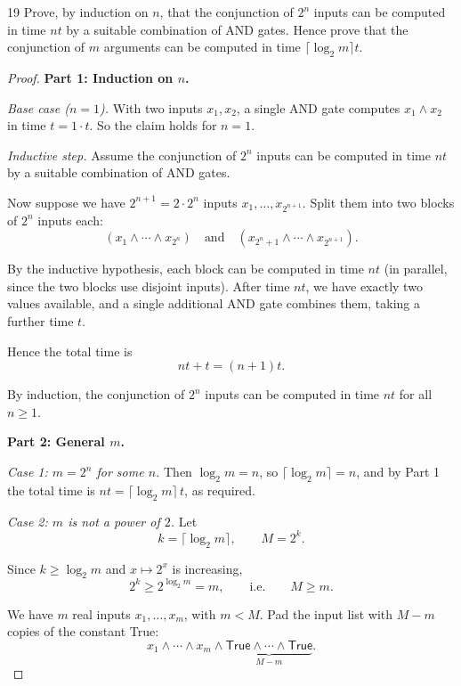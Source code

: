 \begin{exercise}{19}
    Prove, by induction on $n$, that the conjunction of $2^n$ inputs can be
    computed in time $nt$ by a suitable combination of AND gates. Hence prove
    that the conjunction of $m$ arguments can be computed in time
    $\lceil\log_2 m\rceil t$.
\end{exercise}
\begin{solbox}

\begin{proof}
\textbf{Part 1: Induction on $n$.}

\medskip
\noindent\textit{Base case ($n=1$).} With two inputs $x_1,x_2$, a single AND gate computes $x_1\wedge x_2$ in time $t = 1\cdot t$. So the claim holds for $n=1$.

\bigskip
\noindent\textit{Inductive step.} Assume the conjunction of $2^n$ inputs can be computed in time $nt$ by a suitable combination of AND gates.

Now suppose we have $2^{n+1}=2\cdot 2^n$ inputs $x_1,\dots,x_{2^{n+1}}$. Split them into two blocks of $2^n$ inputs each:
\[
(x_1\wedge\cdots\wedge x_{2^n}) \quad\text{and}\quad (x_{2^n+1}\wedge\cdots\wedge x_{2^{n+1}}).
\]

By the inductive hypothesis, each block can be computed in time $nt$ (in parallel, since the two blocks use disjoint inputs). After time $nt$, we have exactly two values available, and a single additional AND gate combines them, taking a further time $t$.

Hence the total time is
\[
nt + t = (n+1)t.
\]

By induction, the conjunction of $2^n$ inputs can be computed in time $nt$ for all $n\geq 1$.

\bigskip
\textbf{Part 2: General $m$.}

\medskip
\noindent\textit{Case 1: $m=2^n$ for some $n$.} Then $\log_2 m = n$, so $\lceil\log_2 m\rceil = n$, and by Part 1 the total time is $nt = \lceil\log_2 m\rceil\, t$, as required.

\bigskip
\noindent\textit{Case 2: $m$ is not a power of $2$.} Let
\[
k = \lceil \log_2 m\rceil, \qquad M = 2^k.
\]

Since $k\geq \log_2 m$ and $x\mapsto 2^x$ is increasing,
\[
2^k \geq 2^{\log_2 m} = m, \qquad\text{i.e.}\qquad M\geq m.
\]

We have $m$ real inputs $x_1,\dots,x_m$, with $m < M$. Pad the input list with $M-m$ copies of the constant \textsf{True}:
\[
x_1\wedge\cdots\wedge x_m\wedge\underbrace{\mathsf{True}\wedge\cdots\wedge\mathsf{True}}_{M-m}.
\]


\end{proof}
\end{solbox}

